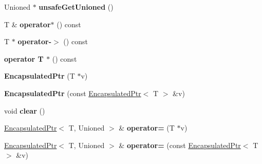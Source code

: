 \begin{DoxyCompactItemize}
\item 
\hypertarget{classjs_1_1_encapsulated_ptr_a5abd1825b4dc7a0373eb0862393cd3cc}{Unioned $\ast$ {\bfseries unsafe\-Get\-Unioned} ()}\label{classjs_1_1_encapsulated_ptr_a5abd1825b4dc7a0373eb0862393cd3cc}

\item 
\hypertarget{classjs_1_1_encapsulated_ptr_aec29d94ea09070089e2fdc73edd889ff}{T \& {\bfseries operator$\ast$} () const }\label{classjs_1_1_encapsulated_ptr_aec29d94ea09070089e2fdc73edd889ff}

\item 
\hypertarget{classjs_1_1_encapsulated_ptr_a3d06f26e68334057b5a11c561e005df4}{T $\ast$ {\bfseries operator-\/$>$} () const }\label{classjs_1_1_encapsulated_ptr_a3d06f26e68334057b5a11c561e005df4}

\item 
\hypertarget{classjs_1_1_encapsulated_ptr_a88583c2a53efd1cb4e5e488aaf1bef0a}{{\bfseries operator T $\ast$} () const }\label{classjs_1_1_encapsulated_ptr_a88583c2a53efd1cb4e5e488aaf1bef0a}

\item 
\hypertarget{classjs_1_1_encapsulated_ptr_ad7cee0b33eed0374b60bed5f5dd904b0}{{\bfseries Encapsulated\-Ptr} (T $\ast$v)}\label{classjs_1_1_encapsulated_ptr_ad7cee0b33eed0374b60bed5f5dd904b0}

\item 
\hypertarget{classjs_1_1_encapsulated_ptr_a26be2bafc7ab356aab2e3c57e44c1fe0}{{\bfseries Encapsulated\-Ptr} (const \hyperlink{classjs_1_1_encapsulated_ptr}{Encapsulated\-Ptr}$<$ T $>$ \&v)}\label{classjs_1_1_encapsulated_ptr_a26be2bafc7ab356aab2e3c57e44c1fe0}

\item 
\hypertarget{classjs_1_1_encapsulated_ptr_a7d5892987e073ecc3d7dbb67f144840b}{void {\bfseries clear} ()}\label{classjs_1_1_encapsulated_ptr_a7d5892987e073ecc3d7dbb67f144840b}

\item 
\hypertarget{classjs_1_1_encapsulated_ptr_a1fbe1ef3fa3ebcc5a291a904c3099c22}{\hyperlink{classjs_1_1_encapsulated_ptr}{Encapsulated\-Ptr}$<$ T, Unioned $>$ \& {\bfseries operator=} (T $\ast$v)}\label{classjs_1_1_encapsulated_ptr_a1fbe1ef3fa3ebcc5a291a904c3099c22}

\item 
\hypertarget{classjs_1_1_encapsulated_ptr_a783ad0cf3bfa37e5734d7517147d312f}{\hyperlink{classjs_1_1_encapsulated_ptr}{Encapsulated\-Ptr}$<$ T, Unioned $>$ \& {\bfseries operator=} (const \hyperlink{classjs_1_1_encapsulated_ptr}{Encapsulated\-Ptr}$<$ T $>$ \&v)}\label{classjs_1_1_encapsulated_ptr_a783ad0cf3bfa37e5734d7517147d312f}


\end{DoxyCompactItemize}
